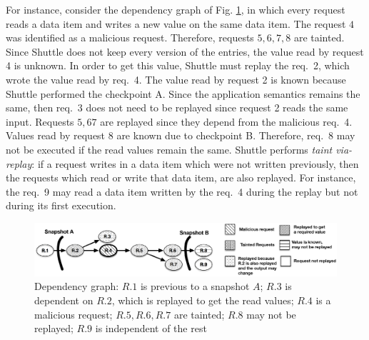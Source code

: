 For instance, consider the dependency graph of Fig. \ref{fig:selectiveGraph}, in which every request reads a data item and writes a new value on the same data item. The request $4$ was identified as a malicious request. Therefore, requests $5,6,7,8$ are tainted. Since Shuttle does not keep every version of the entries, the value read by request 4 is unknown. In order to get this value, Shuttle must replay the {req.~2}, which wrote the value read by {req.~4}. The value read by request 2 is known because Shuttle performed the checkpoint A. Since the application semantics remains the same, then {req.~3} does not need to be replayed since request 2 reads the same input. Requests $5,67$ are replayed since they depend from the malicious {req.~4}. Values read by request 8 are known due to checkpoint B. Therefore, {req.~8} may not be executed if the read values remain the same. Shuttle performs \textit{taint via-replay}: if a request writes in a data item which were not written previously, then the requests which read or write that data item, are also replayed. For instance, the {req.~9} may read a data item written by the {req.~4} during the replay but not during its first execution.\\


\begin{figure}
\centering
\includegraphics[width=150mm]{images/selectiveDependency_legended}
\caption[Dependency graph]{Dependency graph: $R.1$ is previous to a snapshot $A$; $R.3$ is dependent on $R.2$, which is replayed to get the read values; $R.4$ is a malicious request; $R.5,R.6,R.7$ are tainted; $R.8$ may not be replayed; $R.9$ is independent of the rest}
\label{fig:selectiveGraph}
\end{figure}

